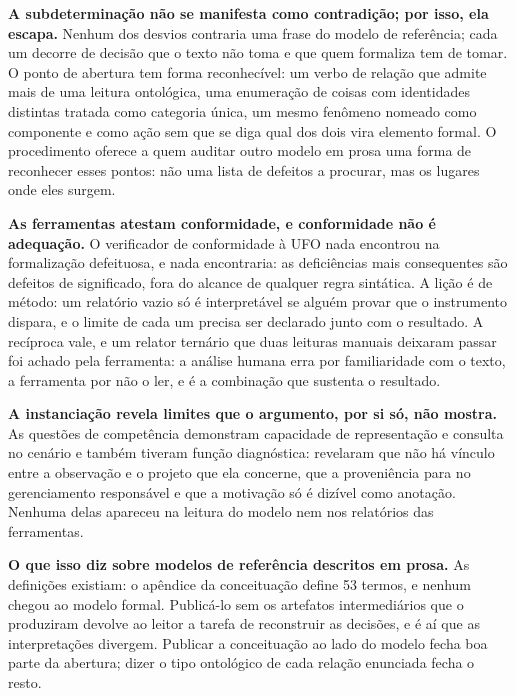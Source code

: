 \textbf{A subdeterminação não se manifesta como contradição; por isso, ela escapa.} Nenhum dos desvios contraria uma frase do modelo de referência; cada um decorre de decisão que o texto não toma e que quem formaliza tem de tomar. O ponto de abertura tem forma reconhecível: um verbo de relação que admite mais de uma leitura ontológica, uma enumeração de coisas com identidades distintas tratada como categoria única, um mesmo fenômeno nomeado como componente e como ação sem que se diga qual dos dois vira elemento formal. O procedimento oferece a quem auditar outro modelo em prosa uma forma de reconhecer esses pontos: não uma lista de defeitos a procurar, mas os lugares onde eles surgem.

\textbf{As ferramentas atestam conformidade, e conformidade não é adequação.} O verificador de conformidade à UFO nada encontrou na formalização defeituosa, e nada encontraria: as deficiências mais consequentes são defeitos de significado, fora do alcance de qualquer regra sintática. A lição é de método: um relatório vazio só é interpretável se alguém provar que o instrumento dispara, e o limite de cada um precisa ser declarado junto com o resultado. A recíproca vale, e um relator ternário que duas leituras manuais deixaram passar foi achado pela ferramenta: a análise humana erra por familiaridade com o texto, a ferramenta por não o ler, e é a combinação que sustenta o resultado.

\textbf{A instanciação revela limites que o argumento, por si só, não mostra.} As questões de competência demonstram capacidade de representação e consulta no cenário e também tiveram função diagnóstica: revelaram que não há vínculo entre a observação e o projeto que ela concerne, que a proveniência para no gerenciamento responsável e que a motivação só é dizível como anotação. Nenhuma delas apareceu na leitura do modelo nem nos relatórios das ferramentas.

\textbf{O que isso diz sobre modelos de referência descritos em prosa.} As definições existiam: o apêndice da conceituação define 53 termos, e nenhum chegou ao modelo formal. Publicá-lo sem os artefatos intermediários que o produziram devolve ao leitor a tarefa de reconstruir as decisões, e é aí que as interpretações divergem. Publicar a conceituação ao lado do modelo fecha boa parte da abertura; dizer o tipo ontológico de cada relação enunciada fecha o resto.

